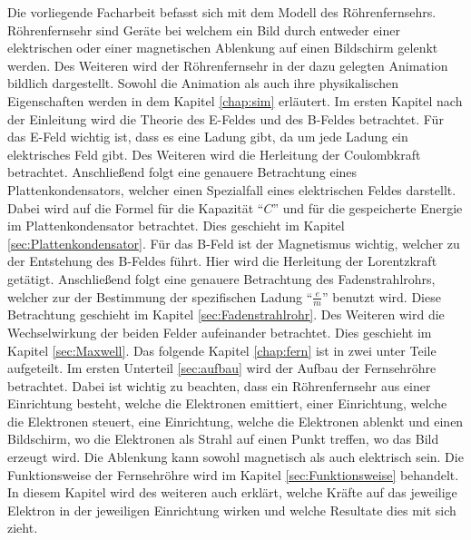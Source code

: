 Die vorliegende Facharbeit befasst sich mit dem Modell des Röhrenfernsehrs.
Röhrenfernsehr sind Geräte bei welchem ein Bild durch entweder einer elektrischen oder einer magnetischen Ablenkung auf einen Bildschirm gelenkt werden.
Des Weiteren wird der Röhrenfernsehr in der dazu gelegten Animation bildlich dargestellt.
Sowohl die Animation als auch ihre physikalischen Eigenschaften werden in dem Kapitel \ref{chap:sim} erläutert.
Im ersten Kapitel nach der Einleitung wird die Theorie des E-Feldes und des B-Feldes betrachtet.
Für das E-Feld wichtig ist, dass es eine Ladung gibt, da um jede Ladung ein elektrisches Feld gibt.
Des Weiteren wird die Herleitung der Coulombkraft betrachtet.
Anschließend folgt eine genauere Betrachtung eines Plattenkondensators, welcher einen Spezialfall eines elektrischen Feldes darstellt.
Dabei wird auf die Formel für die Kapazität "`$C$"' und für die gespeicherte Energie im Plattenkondensator betrachtet.
Dies geschieht im Kapitel \ref{sec:Plattenkondensator}.
Für das B-Feld ist der Magnetismus wichtig, welcher zu der Entstehung des B-Feldes führt.
Hier wird die Herleitung der Lorentzkraft getätigt.
Anschließend folgt eine genauere Betrachtung des Fadenstrahlrohrs, welcher zur der Bestimmung der spezifischen Ladung "`$\frac{e}{m}$"' benutzt wird.
Diese Betrachtung geschieht im Kapitel \ref{sec:Fadenstrahlrohr}.
Des Weiteren wird die Wechselwirkung der beiden Felder aufeinander betrachtet.
Dies geschieht im Kapitel \ref{sec:Maxwell}.
Das folgende Kapitel \ref{chap:fern} ist in zwei unter Teile aufgeteilt.
Im ersten Unterteil \ref{sec:aufbau} wird der Aufbau der Fernsehröhre betrachtet.
Dabei ist wichtig zu beachten, dass ein Röhrenfernsehr aus einer Einrichtung besteht, welche die Elektronen emittiert, einer Einrichtung, welche die Elektronen steuert, eine Einrichtung, welche die Elektronen ablenkt und einen Bildschirm, wo die Elektronen als Strahl auf einen Punkt treffen, wo das Bild erzeugt wird.
Die Ablenkung kann sowohl magnetisch als auch elektrisch sein.
Die Funktionsweise der Fernsehröhre wird im Kapitel \ref{sec:Funktionsweise} behandelt.
In diesem Kapitel wird des weiteren auch erklärt, welche Kräfte auf das jeweilige Elektron in der jeweiligen Einrichtung wirken und welche Resultate dies mit sich zieht.
